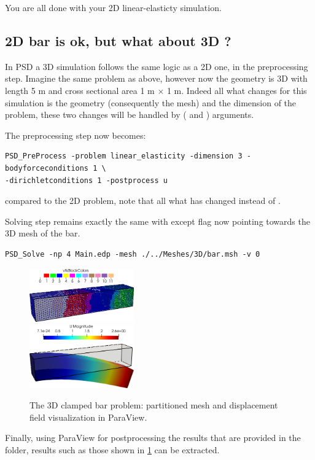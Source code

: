 You are all done with your 2D linear-elasticty simulation.

\subsection{2D bar is ok, but what about 3D ?}

In PSD a 3D simulation follows the same logic as a 2D one, in the
preprocessing step. Imagine the same problem as above, however now the
geometry is 3D with length 5 m and cross sectional area 1 m \(\times\) 1
m. Indeed all what changes for this simulation is the geometry
(consequently the mesh) and the dimension of the problem, these two
changes will be handled by ( and ) arguments.

The preprocessing step now becomes:

\begin{lstlisting}[style=BashInputStyle]
PSD_PreProcess -problem linear_elasticity -dimension 3 -bodyforceconditions 1 \
-dirichletconditions 1 -postprocess u
\end{lstlisting}

compared to the 2D problem, note that all what has changed
 instead of .

Solving step remains exactly the same with except  flag now
pointing towards the 3D mesh of the bar.

\begin{lstlisting}[style=BashInputStyle]
PSD_Solve -np 4 Main.edp -mesh ./../Meshes/3D/bar.msh -v 0
\end{lstlisting}

\begin{figure}[h!]
\centering
\includegraphics[width=0.4\textwidth]{./Images/le-3d-bar-clamped-ends.png}\\
\includegraphics[width=0.4\textwidth]{./Images/le-3d-bar-clamped-pulled-partioned.png}
\caption{The 3D clamped bar problem: partitioned mesh and displacement field visualization in ParaView. \label{3dbar-le-full}}
\end{figure}

Finally, using ParaView for postprocessing the results that are provided
in the \psd{VTUs...} folder, results such as those shown in
\cref{3dbar-le-full} can be extracted.
